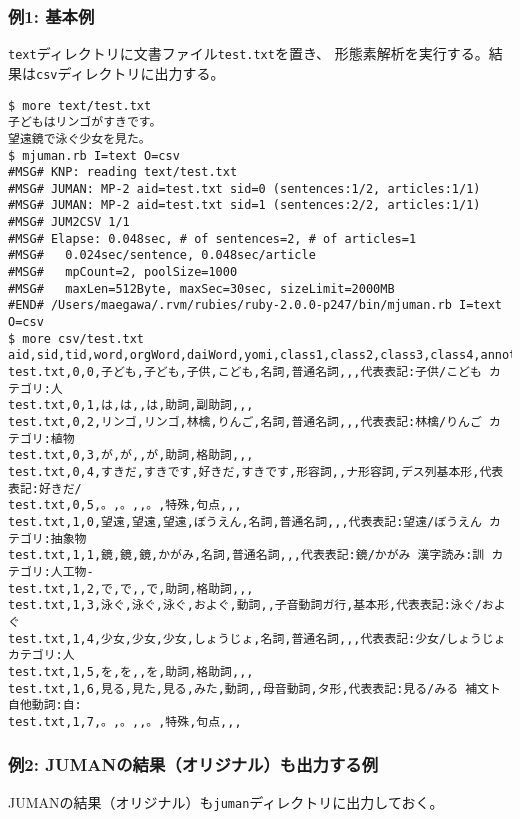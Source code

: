 \subsubsection*{例1: 基本例}

\verb|text|ディレクトリに文書ファイル\verb|test.txt|を置き、
形態素解析を実行する。結果は\verb|csv|ディレクトリに出力する。


\begin{Verbatim}[baselinestretch=0.7,frame=single]
$ more text/test.txt
子どもはリンゴがすきです。
望遠鏡で泳ぐ少女を見た。
$ mjuman.rb I=text O=csv
#MSG# KNP: reading text/test.txt
#MSG# JUMAN: MP-2 aid=test.txt sid=0 (sentences:1/2, articles:1/1)
#MSG# JUMAN: MP-2 aid=test.txt sid=1 (sentences:2/2, articles:1/1)
#MSG# JUM2CSV 1/1
#MSG# Elapse: 0.048sec, # of sentences=2, # of articles=1
#MSG#   0.024sec/sentence, 0.048sec/article
#MSG#   mpCount=2, poolSize=1000
#MSG#   maxLen=512Byte, maxSec=30sec, sizeLimit=2000MB
#END# /Users/maegawa/.rvm/rubies/ruby-2.0.0-p247/bin/mjuman.rb I=text O=csv
$ more csv/test.txt
aid,sid,tid,word,orgWord,daiWord,yomi,class1,class2,class3,class4,annotation
test.txt,0,0,子ども,子ども,子供,こども,名詞,普通名詞,,,代表表記:子供/こども カテゴリ:人
test.txt,0,1,は,は,,は,助詞,副助詞,,,
test.txt,0,2,リンゴ,リンゴ,林檎,りんご,名詞,普通名詞,,,代表表記:林檎/りんご カテゴリ:植物
test.txt,0,3,が,が,,が,助詞,格助詞,,,
test.txt,0,4,すきだ,すきです,好きだ,すきです,形容詞,,ナ形容詞,デス列基本形,代表表記:好きだ/
test.txt,0,5,。,。,,。,特殊,句点,,,
test.txt,1,0,望遠,望遠,望遠,ぼうえん,名詞,普通名詞,,,代表表記:望遠/ぼうえん カテゴリ:抽象物
test.txt,1,1,鏡,鏡,鏡,かがみ,名詞,普通名詞,,,代表表記:鏡/かがみ 漢字読み:訓 カテゴリ:人工物-
test.txt,1,2,で,で,,で,助詞,格助詞,,,
test.txt,1,3,泳ぐ,泳ぐ,泳ぐ,およぐ,動詞,,子音動詞ガ行,基本形,代表表記:泳ぐ/およぐ
test.txt,1,4,少女,少女,少女,しょうじょ,名詞,普通名詞,,,代表表記:少女/しょうじょ カテゴリ:人
test.txt,1,5,を,を,,を,助詞,格助詞,,,
test.txt,1,6,見る,見た,見る,みた,動詞,,母音動詞,タ形,代表表記:見る/みる 補文ト 自他動詞:自:
test.txt,1,7,。,。,,。,特殊,句点,,,
\end{Verbatim}
\subsubsection*{例2: JUMANの結果（オリジナル）も出力する例}

JUMANの結果（オリジナル）も\verb|juman|ディレクトリに出力しておく。


